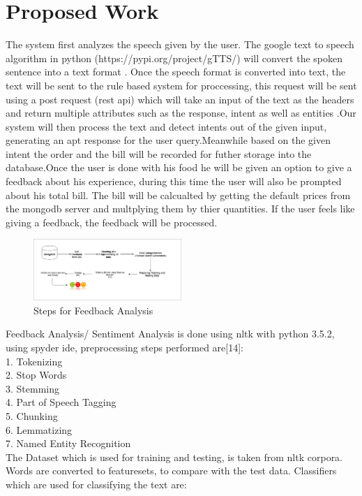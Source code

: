 \documentclass[conference]{IEEEtran}
\begin{document}
{\section{Proposed Work}
The system first analyzes the speech given by the user. The google text to speech algorithm in python (https://pypi.org/project/gTTS/) will convert the spoken sentence into a text format . Once the speech format is converted into text, the text will be sent to the rule based system for proccessing, this request will be sent using a post request (rest api) which will take an input of the text as the headers and return multiple attributes such as the response, intent as well as entities .Our system will then process the text and detect intents out of the given input, generating an apt response for the user query.Meanwhile based on the given intent the order and the bill will be recorded for futher storage into the database.Once the user is done with his food he will be given an option to give a feedback about his experience, during this time the user will also be prompted about his total bill. The bill will be calcualted by getting the default prices from the mongodb server and multplying them by thier quantities. If the user feels like giving a feedback, the feedback will be processed. 
\begin{figure}[h!]
	\centering
	\includegraphics[width=0.5\textwidth]{SA.png}
	\caption{Steps for Feedback Analysis}
\end{figure}
Feedback Analysis/ Sentiment Analysis is done using nltk with python 3.5.2, using spyder ide, preprocessing steps performed are[14]:\\
	1. Tokenizing\\
	2. Stop Words\\
	3. Stemming\\
	4. Part of Speech Tagging\\
	5. Chunking\\
	6. Lemmatizing\\
	7. Named Entity Recognition\\
The Dataset which is used for training and testing, is taken from nltk corpora. Words are converted to featuresets, to compare with the test data. Classifiers which are used for classifying the text are:
}
\end{document}
